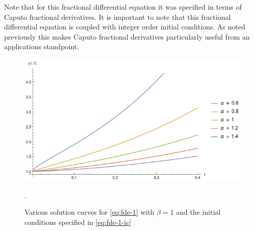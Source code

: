 Note that for this fractional differential equation it was specified in terms of Caputo fractional derivatives. It is important to note that this fractional differential equation is coupled with integer order initial conditions. As noted previously this makes Caputo fractional derivatives particularly useful from an applications standpoint.

\begin{figure}
    \includegraphics[scale=0.7]{images/Mittag-Leffler-Solution}
    \caption{Various solution curves for \eqref{eq:fde-1} with $ \beta = 1 $ and the initial conditions specified in \eqref{eq:fde-1-ic}}.
\end{figure}

